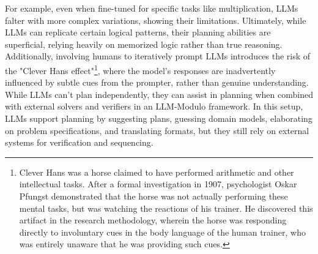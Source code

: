 For example, even when fine-tuned for specific tasks like multiplication, LLMs falter with more complex variations, showing their limitations.
Ultimately, while LLMs can replicate certain logical patterns, their planning abilities are superficial, relying heavily on memorized logic rather than true reasoning.
Additionally, involving humans to iteratively prompt LLMs introduces the risk of the "Clever Hans effect"\footnote{Clever Hans was a horse claimed to have performed arithmetic and other intellectual tasks. After a formal investigation in 1907, psychologist Oskar Pfungst demonstrated that the horse was not actually performing these mental tasks, but was watching the reactions of his trainer. He discovered this artifact in the research methodology, wherein the horse was responding directly to involuntary cues in the body language of the human trainer, who was entirely unaware that he was providing such cues.}, where the model's responses are inadvertently influenced by subtle cues from the prompter, rather than genuine understanding.
While LLMs can't plan independently, they can assist in planning when combined with external solvers and verifiers in an LLM-Modulo framework.
In this setup, LLMs support planning by suggesting plans, guessing domain models, elaborating on problem specifications, and translating formats, but they still rely on external systems for verification and sequencing.

